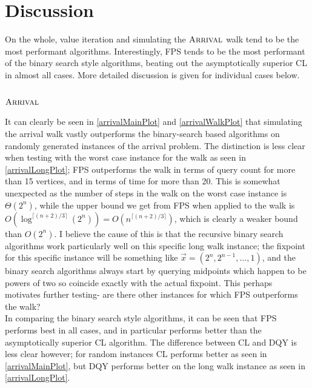 \section{Discussion}
On the whole, value iteration and simulating the $\textsc{Arrival}$ walk tend to be
the most performant algorithms. Interestingly, FPS tends to be the most
performant of the binary search style algorithms, beating out the asymptotically
superior CL in almost all cases. More detailed discussion is given for individual cases below.
\subsection{$\textsc{Arrival}$}
It can clearly be seen in \cref{arrivalMainPlot} and \cref{arrivalWalkPlot}
that simulating the arrival walk vastly outperforms the binary-search based
algorithms on randomly generated instances of the arrival problem.
The distinction is less clear when testing with the worst case instance
for the walk as seen in \cref{arrivalLongPlot}; FPS outperforms the walk
in terms of query count for more than 15 vertices, and in terms of time for more than
20. This is somewhat unexpected as the number of steps in the walk on
the worst case instance is $\Theta(2^n)$, while the upper bound we
get from FPS when applied to the walk is 
$O(\log^{\lceil (n + 2)/3 \rceil } (2^n)) = O(n^{\lceil (n + 2)/3 \rceil})$,
which is clearly a weaker bound than $O(2^n)$. I believe the cause of this
is that the recursive binary search algorithms work particularly well
on this specific long walk instance; the fixpoint for this specific instance
will be something like $\vec{x} = (2^{n}, 2^{n - 1}, ..., 1)$, and the
binary search algorithms always start by querying midpoints which happen
to be powers of two so coincide exactly with the actual fixpoint.
This perhaps motivates further testing- are there other instances
for which FPS outperforms the walk?  \\
In comparing the binary search style algorithms, it can be seen that
FPS performs best in all cases, and in particular performs better
than the asymptotically superior CL algorithm. The difference between
CL and DQY is less clear however; for random instances CL performs
better as seen in \cref{arrivalMainPlot},
but DQY performs better on the long walk instance as seen in \cref{arrivalLongPlot}.

